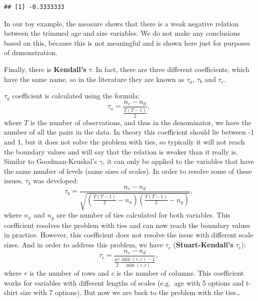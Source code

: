 \documentclass[
]{book}
\theoremstyle{definition}
\theoremstyle{definition}
\theoremstyle{definition}
\theoremstyle{definition}
\theoremstyle{remark}
\begin{document}
\begin{verbatim}
## [1] -0.3333333
\end{verbatim}

In our toy example, the measure shows that there is a weak negative relation between the trimmed age and size variables. We do not make any conclusions based on this, because this is not meaningful and is shown here just for purposes of demonstration.

Finally, there is \textbf{Kendall's} \(\tau\). In fact, there are three different coefficients, which have the same name, so in the literature they are known as \(\tau_a\), \(\tau_b\) and \(\tau_c\).

\(\tau_a\) coefficient is calculated using the formula:
\begin{equation}
    \tau_a = \frac{n_c - n_d}{\frac{T (T-1)}{2}},
    \label{eq:measuresAssociationKendallTaua}
\end{equation}
where \(T\) is the number of observations, and thus in the denominator, we have the number of all the pairs in the data. In theory this coefficient should lie between -1 and 1, but it does not solve the problem with ties, so typically it will not reach the boundary values and will say that the relation is weaker than it really is. Similar to Goodman-Kruskal's \(\gamma\), it can only be applied to the variables that have the same number of levels (same sizes of scales). In order to resolve some of these issues, \(\tau_b\) was developed:
\begin{equation}
    \tau_b = \frac{n_c - n_d}{\sqrt{\left(\frac{T (T-1)}{2} - n_x\right)\left(\frac{T (T-1)}{2} - n_y\right)}},
    \label{eq:measuresAssociationKendallTaub}
\end{equation}
where \(n_x\) and \(n_y\) are the number of ties calculated for both variables. This coefficient resolves the problem with ties and can now reach the boundary values in practice. However, this coefficient does not resolve the issue with different scale sizes. And in order to address this problem, we have \(\tau_c\) (\textbf{Stuart-Kendall's} \(\tau_c\)):
\begin{equation}
    \tau_c = \frac{n_c - n_d}{\frac{n^2}{2}\frac{\min(r, c)-1}{\min(r, c)}},
    \label{eq:measuresAssociationKendallTaub}
\end{equation}
where \(r\) is the number of rows and \(c\) is the number of columns. This coefficient works for variables with different lengths of scales (e.g.~age with 5 options and t-shirt size with 7 options). But now we are back to the problem with the ties\ldots{}
\end{document}
